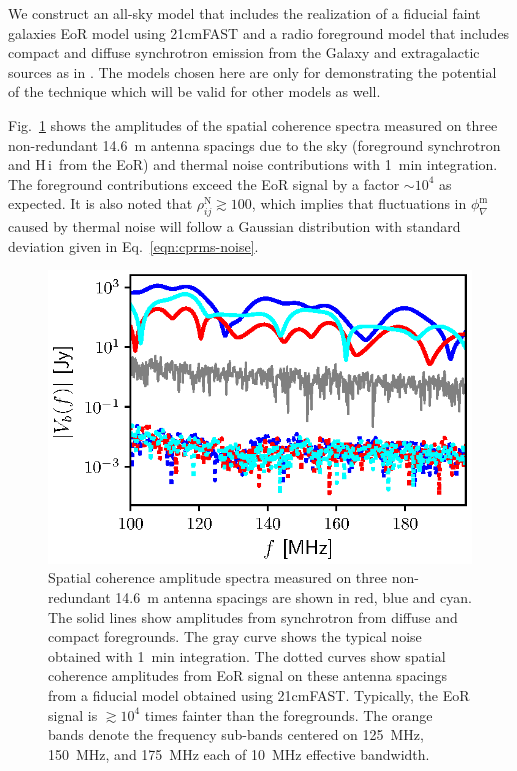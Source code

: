 \documentclass[
reprint,
superscriptaddress,
amsmath,
amssymb,
aps,
prd
]{revtex4-1}
\newcommand{\HI}{H\,{\sc i}}
\begin{document}
We construct an all-sky model that includes the realization of a fiducial {\sc faint galaxies} EoR model \cite{gre17b} using 21cmFAST \cite{mes11} and a radio foreground model that includes compact and diffuse synchrotron emission from the Galaxy and extragalactic sources as in \cite{thy15a}. The models chosen here are only for demonstrating the potential of the technique which will be valid for other models as well.

Fig.~\ref{fig:vis-spectra} shows the amplitudes of the spatial coherence spectra measured on three non-redundant 14.6~m antenna spacings due to the sky (foreground synchrotron and \HI\ from the EoR) and thermal noise contributions with 1~min integration. The foreground contributions exceed the EoR signal by a factor $\sim 10^4$ as expected. It is also noted that $\rho_{ij}^\textrm{N} \gtrsim 100$, which implies that fluctuations in $\phi_\nabla^\textrm{m}$ caused by thermal noise will follow a Gaussian distribution with standard deviation given in Eq.~\ref{eqn:cprms-noise}.

\begin{figure}[htb]
\includegraphics[width=\linewidth]{visamp_spectra_asm_eor_noise}
\caption{Spatial coherence amplitude spectra measured on three non-redundant 14.6~m antenna spacings are shown in red, blue and cyan. The solid lines show amplitudes from synchrotron from diffuse and compact foregrounds. The gray curve shows the typical noise obtained with 1~min integration. The dotted curves show spatial coherence amplitudes from EoR signal on these antenna spacings from a fiducial model obtained using 21cmFAST. Typically, the EoR signal is $\gtrsim 10^4$ times fainter than the foregrounds. The orange bands denote the frequency sub-bands centered on 125~MHz, 150~MHz, and 175~MHz each of 10~MHz effective bandwidth. \label{fig:vis-spectra}}
\end{figure}
\end{document}
